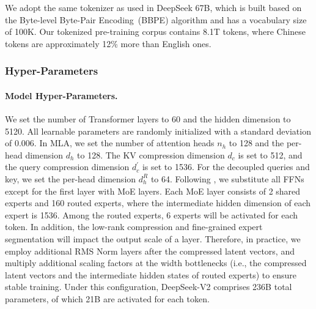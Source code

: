\documentclass[11pt, a4paper, logo, copyright, nonumbering]{deepseek}
\newcommand{\dsvi}{DeepSeek 67B}
\newcommand{\dsvii}{DeepSeek-V2}
\newcommand{\dsattn}{MLA}
\begin{document}
\begin{CJK*}{UTF8}{gbsn}
We adopt the same tokenizer as used in \dsvi{}, which is built based on the Byte-level Byte-Pair Encoding~(BBPE) algorithm and has a vocabulary size of 100K. 
Our tokenized pre-training corpus contains 8.1T tokens, where Chinese tokens are approximately 12\% more than English ones. 

\subsubsection{Hyper-Parameters}

\paragraph{Model Hyper-Parameters.}
We set the number of Transformer layers to 60 and the hidden dimension to 5120. 
All learnable parameters are randomly initialized with a standard deviation of 0.006.
In \dsattn{}, we set the number of attention heads $n_h$ to 128 and the per-head dimension $d_h$ to 128. 
The KV compression dimension $d_c$ is set to 512, and the query compression dimension $d_c^{\prime}$ is set to 1536. 
For the decoupled queries and key, we set the per-head dimension $d_h^R$ to 64. 
Following \citet{deepseekmoe}, we substitute all FFNs except for the first layer with MoE layers. 
Each MoE layer consists of 2 shared experts and 160 routed experts, where the intermediate hidden dimension of each expert is 1536. 
Among the routed experts, 6 experts will be activated for each token. 
In addition, the low-rank compression and fine-grained expert segmentation will impact the output scale of a layer. 
Therefore, in practice, we employ additional RMS Norm layers after the compressed latent vectors, and multiply additional scaling factors at the width bottlenecks (i.e., the compressed latent vectors and the intermediate hidden states of routed experts) to ensure stable training. 
Under this configuration, \dsvii{} comprises 236B total parameters, of which 21B are activated for each token. 


\end{CJK*}
\end{document}

